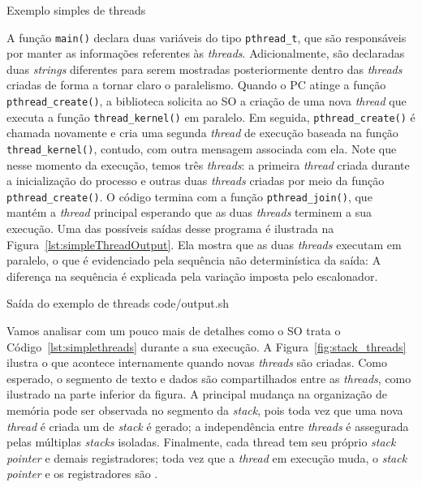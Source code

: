 \begin{ruledcaption}{Exemplo simples de threads\label{lst:simplethreads}}

\end{ruledcaption}

A função \texttt{main()} declara duas variáveis do tipo \texttt{pthread\_t},
que são responsáveis por manter as informações referentes às \emph{threads}.
Adicionalmente, são declaradas duas \emph{strings} diferentes para serem
mostradas posteriormente dentro das \emph{threads} criadas de forma a
tornar claro o paralelismo. Quando o PC atinge a função
\texttt{pthread\_create()}, a biblioteca solicita ao SO a criação de uma nova
\emph{thread} que executa a função \texttt{thread\_kernel()} em paralelo. Em
seguida, \texttt{pthread\_create()} é chamada novamente e cria uma segunda
\emph{thread} de execução baseada na função \texttt{thread\_kernel()}, contudo,
com outra mensagem associada com ela. Note que nesse momento da execução, temos
três \emph{threads}: a primeira \emph{thread} criada durante a inicialização do
processo e outras duas \emph{threads} criadas por meio da função
\texttt{pthread\_create()}. O código termina com a função
\texttt{pthread\_join()}, que mantém a \emph{thread} principal esperando que as
duas \emph{threads} terminem a sua execução. Uma das possíveis saídas desse
programa é ilustrada na Figura~\ref{lst:simpleThreadOutput}. Ela mostra que as
duas \emph{threads} executam em paralelo, o que é evidenciado pela sequência não
determinística da saída: A diferença na sequência é explicada pela variação
imposta pelo escalonador.

\begin{ruledcaption}{Saída do exemplo de threads\label{lst:simpleThreadOutput}}
 {code/output.sh}
\end{ruledcaption}

Vamos analisar com um pouco mais de detalhes como o SO trata o
Código~\ref{lst:simplethreads} durante a sua execução. A
Figura~\ref{fig:stack_threads} ilustra o que acontece internamente quando
novas \emph{threads} são criadas. Como esperado, o segmento de texto e dados
são compartilhados entre as \emph{threads}, como ilustrado na parte inferior da
figura. A principal mudança na organização de memória pode ser observada no segmento da \emph{stack},
pois toda vez que uma nova \emph{thread} é criada um  de
\emph{stack} é gerado; a independência entre \emph{threads} é assegurada pelas
múltiplas \emph{stacks} isoladas. Finalmente, cada thread tem seu próprio
\emph{stack pointer} e demais registradores; toda vez que a \emph{thread} em execução muda, o
\emph{stack pointer} e os registradores são .

